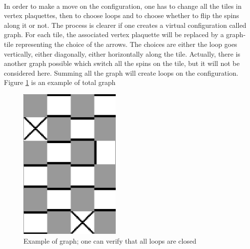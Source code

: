 \documentclass[a4paper,12pt,twoside]{article}
\begin{document}
{	\paragraph{}
	In order to make a move on the configuration, one has to change all the tiles in vertex plaquettes, then to choose loops and to choose whether to flip the spins along it or not. The process is clearer if one creates a virtual configuration called graph. For each tile, the associated vertex plaquette will be replaced by a graph-tile representing the choice of the arrows. The choices are either the loop goes vertically, either diagonally, either horizontally along the tile. Actually, there is another graph possible which switch all the spins on the tile, but it will not be considered here. Summing all the graph will create loops on the configuration. Figure \ref{graph_example} is an example of total graph
	\begin{figure}[!h]
		 \centering
		 \includegraphics[width = 5cm]{random_graph.png}
		 \caption{Example of graph; one can verify that all loops are closed}
		 \label{graph_example}
	\end{figure}
}
\end{document}
